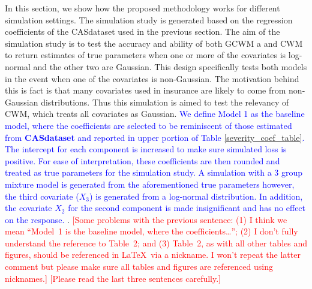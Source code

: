 \documentclass[11pt,letterpaper]{article}
\numberwithin{equation}{section}
\numberwithin{equation}{section}
\numberwithin{equation}{section}
\begin{document}
In this section, we show how the proposed methodology works for different simulation settings. The simulation study is generated based on the regression coefficients of the CASdataset used in the previous section. The aim of the simulation study is to test the accuracy and ability of both GCWM a and CWM to return estimates of true parameters when one or more of the covariates is log-normal and the other two are Gaussian. This design specifically tests both models in the event when one of the covariates is non-Gaussian. The motivation behind this is fact is that many covariates used in insurance are likely to come from non-Gaussian distributions. Thus this simulation is aimed to test the relevancy of CWM, which treats all covariates as Gaussian.
\textcolor{blue}{
We define Model 1 as the baseline model, where the coefficients are selected to be reminiscent of those estimated from \textbf{CASdataset} and reported in upper portion of Table \ref{severity_coef_table}. The intercept for each component is increased to make sure simulated loss is positive. For ease of interpretation, these coefficients are then rounded and treated as true parameters for the simulation study.  A simulation with a 3 group mixture model is generated from the aforementioned true parameters however, the third covariate ($X_3$) is generated from a log-normal distribution.  In addition, the covariate $X_2$ for the second component is made insignificant and has no effect on the response. 
}
. \textcolor{red}{[Some problems with the previous sentence: (1) I think we mean ``Model~1 is the baseline model, where the coefficients\ldots''; (2) I don't fully understand the reference to Table~2; and (3) Table~2, as with all other tables and figures, should be referenced in \LaTeX\ via a nickname. I won't repeat the latter comment but please make sure all tables and figures are referenced using nicknames.]} \textcolor{red}{[Please read the last three sentences carefully.]}
\end{document}
